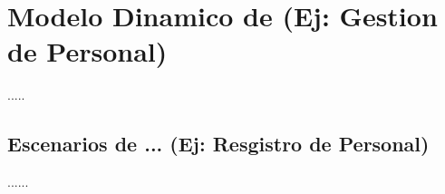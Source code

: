 
\section{Modelo Dinamico de (Ej: Gestion de Personal)}

.....

\subsection{Escenarios de ... (Ej: Resgistro de Personal)}
 
......





